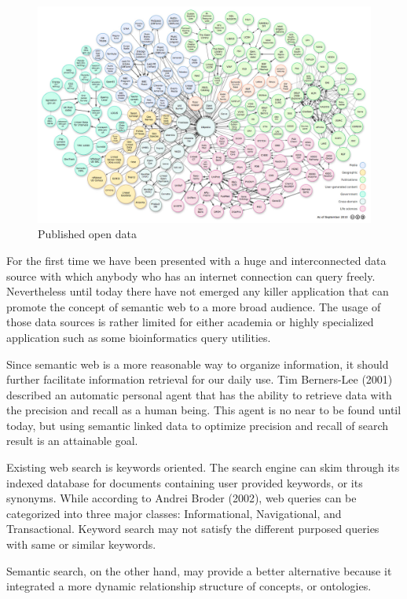 \documentclass[12pt]{cls}
\begin{document}
\begin{figure}[ht!]
\centering
\includegraphics[width=\textwidth]{figures/opendata.jpeg}
\caption{Published open data}
\label{open data chart}
\end{figure}

For the first time we have been presented with a huge and interconnected data source with which anybody who has an internet connection can query freely. Nevertheless until today there have not emerged any killer application that can promote the concept of semantic web to a more broad audience. The usage of those data sources is rather limited for either academia or highly specialized application such as some bioinformatics query utilities.

Since semantic web is a more reasonable way to organize information, it should further facilitate information retrieval for our daily use. Tim Berners-Lee (2001) described an automatic personal agent that has the ability to retrieve data with the precision and recall as a human being. This agent is no near to be found until today, but using semantic linked data to optimize precision and recall of search result is an attainable goal.

Existing web search is keywords oriented. The search engine can skim through its indexed database for documents containing user provided keywords, or its synonyms. While according to Andrei Broder (2002), web queries can be categorized into three major classes: Informational, Navigational, and Transactional. Keyword search may not satisfy the different purposed queries with same or similar keywords.

Semantic search, on the other hand, may provide a better alternative because it integrated a more dynamic relationship structure of concepts, or ontologies.
\end{document}
